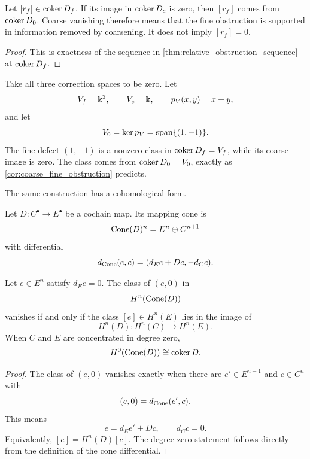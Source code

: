 \begin{corollary}\label{cor:coarse_fine_obstruction}
Let $[r_f]\in\operatorname{coker} D_f$.  If its image in $\operatorname{coker} D_c$ is zero, then $[r_f]$ comes from $\operatorname{coker} D_0$.  Coarse vanishing therefore means that the fine obstruction is supported in information removed by coarsening.  It does not imply $[r_f]=0$.
\end{corollary}

\begin{proof}
This is exactness of the sequence in \cref{thm:relative_obstruction_sequence} at $\operatorname{coker} D_f$.
\end{proof}

\begin{example}\label{ex:coarse_cancellation}
Take all three correction spaces to be zero.  Let
\[
V_f=\Bbbk^2,
\qquad
V_c=\Bbbk,
\qquad
p_V(x,y)=x+y,
\]
and let
\[
V_0=\operatorname{ker} p_V=\operatorname{span}\{(1,-1)\}.
\]
The fine defect $(1,-1)$ is a nonzero class in $\operatorname{coker} D_f=V_f$, while its coarse image is zero.  The class comes from $\operatorname{coker} D_0=V_0$, exactly as \cref{cor:coarse_fine_obstruction} predicts.
\end{example}

The same construction has a cohomological form.

\begin{definition}\label{def:mapping_cone}
Let $D:C^\bullet\to E^\bullet$ be a cochain map.  Its mapping cone is
\[
\operatorname{Cone}(D)^n=E^n\oplus C^{n+1}
\]
with differential
\[
d_{\operatorname{Cone}}(e,c)=(d_Ee+Dc,-d_Cc).
\]
\end{definition}

\begin{theorem}\label{thm:cone_obstruction}
Let $e\in E^n$ satisfy $d_Ee=0$.  The class of $(e,0)$ in
\[
H^n(\operatorname{Cone}(D))
\]
vanishes if and only if the class $[e]\in H^n(E)$ lies in the image of
\[
H^n(D):H^n(C)\longrightarrow H^n(E).
\]
When $C$ and $E$ are concentrated in degree zero,
\[
H^0(\operatorname{Cone}(D))\cong\operatorname{coker} D.
\]
\end{theorem}

\begin{proof}
The class of $(e,0)$ vanishes exactly when there are $e'\in E^{n-1}$ and $c\in C^n$ with
\[
(e,0)=d_{\operatorname{Cone}}(e',c).
\]
This means
\[
e=d_Ee'+Dc,
\qquad
d_Cc=0.
\]
Equivalently, $[e]=H^n(D)[c]$.  The degree zero statement follows directly from the definition of the cone differential.
\end{proof}


